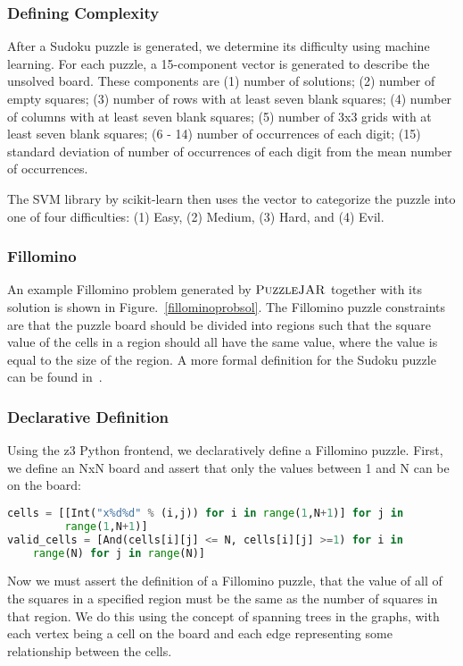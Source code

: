 \subsubsection*{Defining Complexity}
After a Sudoku puzzle is generated, we determine its difficulty using
machine learning. For each puzzle, a 15-component vector is generated to describe the unsolved board. These components are (1) number of solutions; (2) number of empty squares; (3) number of rows with at least seven blank squares; (4) number of columns with at least seven blank squares; (5) number of 3x3 grids with at least seven blank squares; (6 - 14) number of occurrences of each digit; (15) standard deviation of number of occurrences of each digit from the mean number of occurrences.

The SVM library by scikit-learn then uses the vector to categorize the
puzzle into one of four difficulties: (1) Easy, (2) Medium, (3) Hard,
and (4) Evil.

\subsubsection{Fillomino}

An example Fillomino problem generated by $\textsc{PuzzleJAR}$ together with its
solution is shown in Figure.~\ref{fillominoprobsol}. The Fillomino puzzle constraints are that the puzzle board should be divided into regions such that the square value of the cells in a region should all have the same value, where the value is equal to the size of the region. A more formal definition for the Sudoku puzzle can be found in~\cite{fillominodef}.

\subsubsection*{Declarative Definition}
Using the z3 Python frontend, we declaratively define a Fillomino puzzle.
First, we define an NxN board and assert that only the values between
1 and N can be on the board: 

\singlespace
\begin{lstlisting}[language=python, frame=single]
cells = [[Int("x%d%d" % (i,j)) for i in range(1,N+1)] for j in
         range(1,N+1)]
valid_cells = [And(cells[i][j] <= N, cells[i][j] >=1) for i in
	range(N) for j in range(N)]
\end{lstlisting}
\doublespace

Now we must assert the definition of a Fillomino puzzle, that the
value of all of the squares in a specified region must be the same as
the number of squares in that region. We do this using the concept of
spanning trees in the graphs, with each vertex being a cell on the board
and each edge representing some relationship between the cells.

